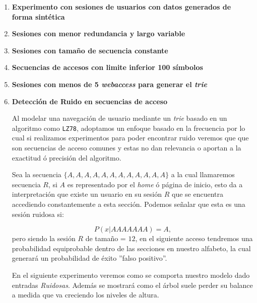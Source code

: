 \vspace{1cm}
\begin{enumerate}
	\item\label{exp1} \textbf{Experimento con sesiones de usuarios con datos generados de forma sintética}
	
	
	
	\newpage
	\item \label{exp2} \textbf{Sesiones con menor redundancia y  largo variable }
	


	\item \label{exp3}	
	\textbf{Sesiones con tamaño de secuencia constante}
	
	

	\item \label{exp4} \textbf{Secuencias de accesos con limite inferior 100 símbolos }
	


	\item \label{exp5}	
	\textbf{Sesiones con menos de 5 \emph{webaccess} para generar el \emph{trie}}
		
	
	
	\item \label{exp6} 
	\textbf{Detección de Ruido en secuencias de acceso}
	
	Al modelar una navegación de usuario mediante un \emph{trie} basado en un algoritmo como \texttt{LZ78}, adoptamos un enfoque basado en la frecuencia por lo cual si realizamos experimentos para poder encontrar ruido veremos que que son secuencias de acceso comunes y estas no dan relevancia o aportan a la exactitud ó precisión del algoritmo.
	
	Sea la secuencia $\{A,A,A,A,A,A,A,A,A,A,A,A \}$ a la cual llamaremos secuencia $R$, si $A$ es representado por el \emph{home} ó página de inicio, esto da a interpretación que existe un usuario en su sesión $R$ que se encuentra accediendo constantemente a esta sección. Podemos señalar que esta es una sesión ruidosa si:
	
	\begin{equation}
		P( x | AAAAAAA)= A ,	
	\end{equation} pero siendo la sesión $R$ de tamaño = $12$, en el siguiente acceso tendremos una probabilidad equiprobable dentro de las secciones en nuestro alfabeto, la cual generará un probabilidad de éxito ''falso positivo''.
	
	En el siguiente experimento veremos como se comporta nuestro modelo dado entradas \emph{Ruidosas}. Además se mostrará como el árbol suele perder su balance a medida que va creciendo los niveles de altura. 
	

\end{enumerate}
